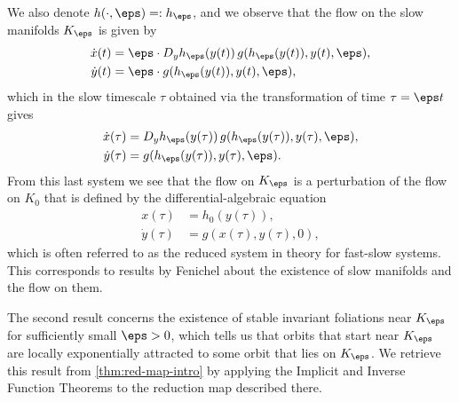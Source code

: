 \documentclass[a4paper]{siamart190516}
\begin{document}
We also denote $h(\cdot,\eps) =: h_{\eps}$, and we observe that the flow on the slow manifolds $K_{\eps}$ is given by
\begin{align*}
 \begin{split} 
 \dot{x}(t) &= \eps \cdot D_y h_{\eps}(y(t)) \, g(h_{\eps}(y(t)),y(t), \eps), \\
 \dot{y}(t) &= \eps \cdot g(h_{\eps}(y(t)),y(t), \eps),
 \end{split}
 \end{align*}
 which in the slow timescale $\tau$ obtained via the transformation of time $\tau = \eps t$ gives 
 \begin{align*}
 \begin{split} 
 \dot{x}(\tau) &= D_y h_{\eps}(y(\tau)) \, g(h_{\eps}(y(\tau)),y(\tau), \eps), \\
 \dot{y}(\tau) &= g(h_{\eps}(y(\tau)),y(\tau), \eps).
 \end{split}
 \end{align*}
 From this last system we see that the flow on $K_{\eps}$ is a perturbation of the flow on $K_0$ that is defined by the differential-algebraic equation
 \begin{equation}\label{fs-system-bdd-vf-reduced}
 \begin{aligned}
 x(\tau) &= h_0(y(\tau)), \\
 \dot{y}(\tau) &= g(x(\tau),y(\tau), 0),
 \end{aligned}
 \end{equation}
 which is often referred to as the reduced system in theory for fast-slow systems. This corresponds to results by Fenichel about the existence of slow manifolds and the flow on them. 

The second result concerns the existence of stable invariant foliations near
$K_{\eps}$ for sufficiently small $\eps > 0$, which tells us that orbits that start
near $K_{\eps}$ are locally exponentially attracted to some orbit that lies on
$K_{\eps}$. We retrieve this result from \cref{thm:red-map-intro} by applying
the Implicit and Inverse Function Theorems to the reduction map described there.
\end{document}
